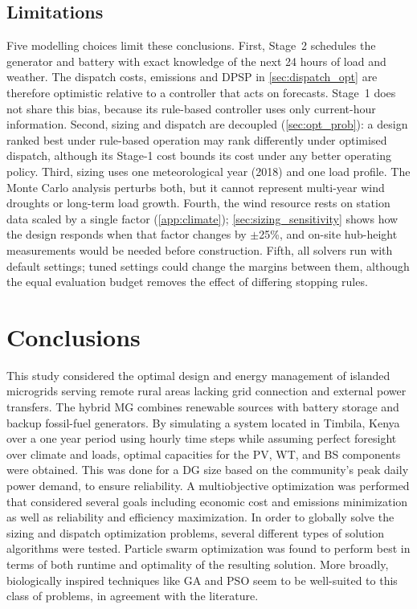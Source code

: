 \documentclass[final,3p,times]{elsarticle}
\begin{document}
\subsection{Limitations\label{sec:limitations}}
Five modelling choices limit these conclusions. First, Stage~2 schedules the generator and battery with exact knowledge of the next 24 hours of load and weather. The dispatch costs, emissions and DPSP in \cref{sec:dispatch_opt} are therefore optimistic relative to a controller that acts on forecasts. Stage~1 does not share this bias, because its rule-based controller uses only current-hour information. Second, sizing and dispatch are decoupled (\cref{sec:opt_prob}): a design ranked best under rule-based operation may rank differently under optimised dispatch, although its Stage-1 cost bounds its cost under any better operating policy. Third, sizing uses one meteorological year (2018) and one load profile. The Monte Carlo analysis perturbs both, but it cannot represent multi-year wind droughts or long-term load growth. Fourth, the wind resource rests on station data scaled by a single factor (\cref{app:climate}); \cref{sec:sizing_sensitivity} shows how the design responds when that factor changes by $\pm$25\%, and on-site hub-height measurements would be needed before construction. Fifth, all solvers run with default settings; tuned settings could change the margins between them, although the equal evaluation budget removes the effect of differing stopping rules.

\section{Conclusions}

This study considered the optimal design and energy management of islanded microgrids serving remote rural areas lacking grid connection and external power transfers. The hybrid MG combines renewable sources with battery storage and backup fossil-fuel generators. By simulating a system located in Timbila, Kenya over a one year period using hourly time steps while assuming perfect foresight over climate and loads, optimal capacities for the PV, WT, and BS components were obtained. This was done for a DG size based on the community's peak daily power demand, to ensure reliability. A multiobjective optimization was performed that considered several goals including economic cost and emissions minimization as well as reliability and efficiency maximization. In order to globally solve the sizing and dispatch optimization problems, several different types of solution algorithms were tested. Particle swarm optimization was found to perform best in terms of both runtime and optimality of the resulting solution. More broadly, biologically inspired techniques like GA and PSO seem to be well-suited to this class of problems, in agreement with the literature. 
\end{document}
